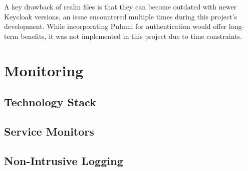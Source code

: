 A key drawback of realm files is that they can become outdated with newer Keycloak versions, an issue encountered multiple times during this project's development. While incorporating Pulumi for authentication would offer long-term benefits, it was not implemented in this project due to time constraints.

\section{Monitoring}

\subsection{Technology Stack}

\subsection{Service Monitors}

\subsection{Non-Intrusive Logging}







